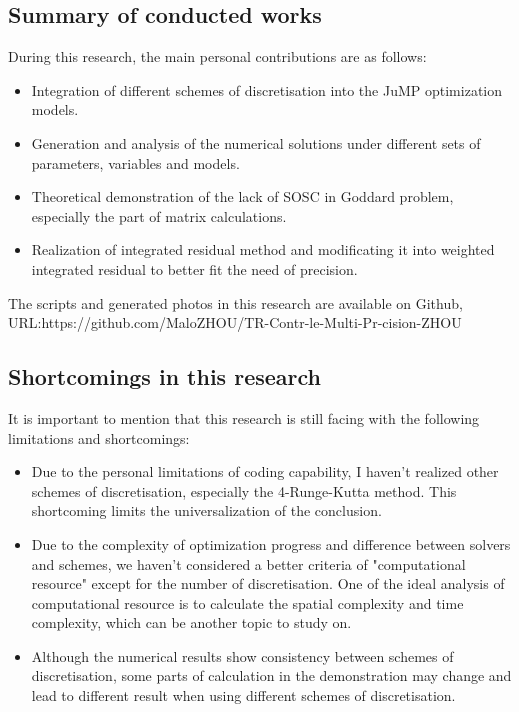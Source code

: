 \documentclass{article}
\begin{document}
\subsection{Summary of conducted works}
During this research, the main personal contributions are as follows:
\begin{itemize}
    \item Integration of different schemes of discretisation into the JuMP optimization models.
    \item Generation and analysis of the numerical solutions under different sets of parameters, variables and models.
    \item Theoretical demonstration of the lack of SOSC in Goddard problem, especially the part of matrix calculations.
    \item Realization of integrated residual method and modificating it into weighted integrated residual to better fit the need of precision.
\end{itemize}
The scripts and generated photos in this research are available on Github, URL:https://github.com/MaloZHOU/TR-Contr-le-Multi-Pr-cision-ZHOU
\subsection{Shortcomings in this research}
It is important to mention that this research is still facing with the following limitations and shortcomings:
\begin{itemize}
    \item Due to the personal limitations of coding capability, I haven't realized other schemes of discretisation, especially the 4-Runge-Kutta method. This shortcoming limits the universalization of the conclusion.
    \item Due to the complexity of optimization progress and difference between solvers and schemes, we haven't considered a better criteria of "computational resource" except for the number of discretisation. One of the ideal analysis of computational resource is to calculate the spatial complexity and time complexity, which can be another topic to study on.
    \item Although the numerical results show consistency between schemes of discretisation, some parts of calculation in the demonstration may change and lead to different result when using different schemes of discretisation.
\end{itemize}
\clearpage
\end{document}
